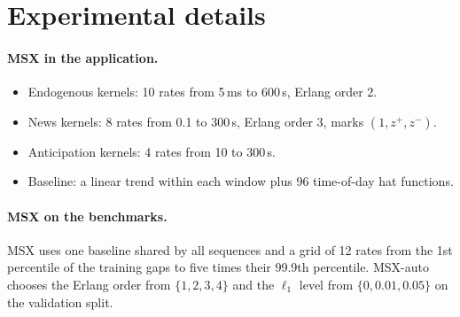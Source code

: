 \section{Experimental details}\label{app:details}

\paragraph{MSX in the application.}
\begin{itemize}
\item Endogenous kernels: 10 rates from 5\,ms to 600\,s, Erlang order 2.
\item News kernels: 8 rates from 0.1 to 300\,s, Erlang order 3, marks $(1,z^+,z^-)$.
\item Anticipation kernels: 4 rates from 10 to 300\,s.
\item Baseline: a linear trend within each window plus 96 time-of-day hat functions.
\end{itemize}

\paragraph{MSX on the benchmarks.} MSX uses one baseline shared by all sequences and a grid of 12
rates from the 1st percentile of the training gaps to five times their 99.9th percentile.
MSX-auto chooses the Erlang order from $\{1,2,3,4\}$ and the $\ell_1$ level from
$\{0,0.01,0.05\}$ on the validation split.

